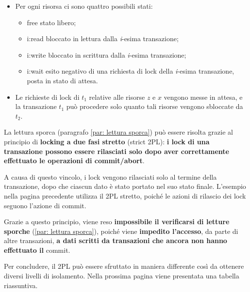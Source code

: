 \documentclass[a4paper]{article}
\begin{document}
	\noindent
	\begin{itemize}
		\item Per ogni risorsa ci sono quattro possibili stati:
		\begin{itemize}
			\item \textsf{free} stato libero;
			
			\item \textsf{i:read} bloccato in lettura dalla \emph{i}-esima transazione;
			
			\item \textsf{i:write} bloccato in scrittura dalla \emph{i}-esima transazione;
			
			\item \textsf{i:wait} esito negativo di una richiesta di lock della \emph{i}-esima transazione, posta in stato di attesa.
		\end{itemize}
	
		\item Le richieste di lock di $t_{1}$ relative alle risorse $z$ e $x$ vengono messe in attesa, e la transazione $t_{1}$ può procedere solo quanto tali risorse vengono sbloccate da $t_{2}$.
	\end{itemize}\newpage

	\noindent
	La lettura sporca (paragrafo \ref{par: lettura sporca}) può essere risolta grazie al principio di \textcolor{Red3}{\textbf{locking a due fasi stretto}} (strict 2PL): \textbf{i lock di una transazione possono essere rilasciati solo dopo aver correttamente effettuato le operazioni di \textsf{commit}/\textsf{abort}}.\newline
	
	\noindent
	A causa di questo vincolo, i lock vengono rilasciati solo al termine della transazione, dopo che ciascun dato è stato portato nel suo stato finale. L'esempio nella pagina precedente utilizza il 2PL stretto, poiché le azioni di rilascio dei lock seguono l'azione di \textsf{commit}.\newline
	
	\noindent
	Grazie a questo principio, viene reso \textbf{impossibile il verificarsi di letture sporche} (\ref{par: lettura sporca}), poiché viene \textbf{impedito l'accesso}, da parte di altre transazioni, \textbf{a dati scritti da transazioni che ancora non hanno effettuato il} \textsf{commit}.\newline
	
	\noindent
	Per concludere, il 2PL può essere sfruttato in maniera differente così da ottenere diversi livelli di isolamento. Nella prossima pagina viene presentata una tabella riassuntiva.
	
\end{document}
